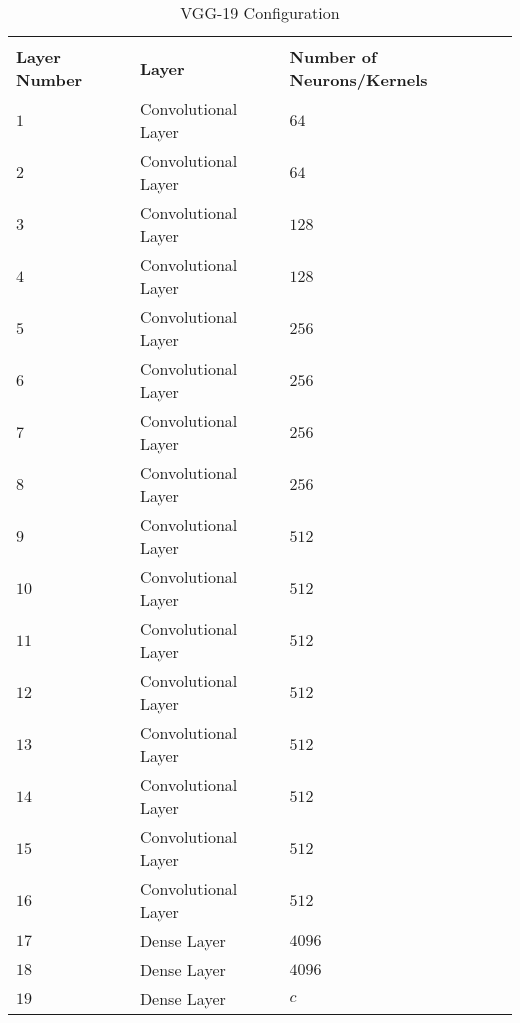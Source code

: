 \begin{xltabular}{\textwidth}{lXl}\toprule
	\caption{VGG-19 Configuration} \label{tab:vgg}\\
	\textbf{Layer Number} & \textbf{Layer} & \textbf{Number of Neurons/Kernels} \\\midrule \endhead
	$1$ & Convolutional Layer & $64$\\\midrule
	$2$ & Convolutional Layer & $64$\\\midrule
	$3$ & Convolutional Layer & $128$\\\midrule
	$4$ & Convolutional Layer & $128$\\\midrule
	$5$ & Convolutional Layer & $256$\\\midrule
	$6$ & Convolutional Layer & $256$\\\midrule
	$7$ & Convolutional Layer & $256$\\\midrule
	$8$ & Convolutional Layer & $256$\\\midrule
	$9$ & Convolutional Layer & $512$\\\midrule
	$10$ & Convolutional Layer & $512$\\\midrule
	$11$ & Convolutional Layer & $512$\\\midrule
	$12$ & Convolutional Layer & $512$\\\midrule
	$13$ & Convolutional Layer & $512$\\\midrule
	$14$ & Convolutional Layer & $512$\\\midrule
	$15$ & Convolutional Layer & $512$\\\midrule
	$16$ & Convolutional Layer & $512$\\\midrule
	$17$ & Dense Layer & $4096$\\\midrule
	$18$ & Dense Layer & $4096$\\\midrule
	$19$ & Dense Layer & $c$
	\\\bottomrule
\end{xltabular}
